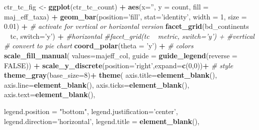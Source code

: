 \documentclass[
]{article}
\newenvironment{Shaded}{\begin{snugshade}}{\end{snugshade}}
\newcommand{\CommentTok}[1]{\textcolor[rgb]{0.56,0.35,0.01}{\textit{#1}}}
\newcommand{\DataTypeTok}[1]{\textcolor[rgb]{0.13,0.29,0.53}{#1}}
\newcommand{\DecValTok}[1]{\textcolor[rgb]{0.00,0.00,0.81}{#1}}
\newcommand{\FloatTok}[1]{\textcolor[rgb]{0.00,0.00,0.81}{#1}}
\newcommand{\KeywordTok}[1]{\textcolor[rgb]{0.13,0.29,0.53}{\textbf{#1}}}
\newcommand{\NormalTok}[1]{#1}
\newcommand{\OperatorTok}[1]{\textcolor[rgb]{0.81,0.36,0.00}{\textbf{#1}}}
\newcommand{\OtherTok}[1]{\textcolor[rgb]{0.56,0.35,0.01}{#1}}
\newcommand{\StringTok}[1]{\textcolor[rgb]{0.31,0.60,0.02}{#1}}
\begin{document}
\begin{Shaded}
\begin{Highlighting}[]
{{{{\NormalTok{ctr_tc_fig <-}\StringTok{ }\KeywordTok{ggplot}\NormalTok{(ctr_tc_count) }\OperatorTok{+}
\StringTok{                    }\KeywordTok{aes}\NormalTok{(}\DataTypeTok{x=}\StringTok{''}\NormalTok{, }\DataTypeTok{y =}\NormalTok{ count, }\DataTypeTok{fill =}\NormalTok{ maj_eff_taxa) }\OperatorTok{+}
\StringTok{                    }\KeywordTok{geom_bar}\NormalTok{(}\DataTypeTok{position=}\StringTok{'fill'}\NormalTok{,}
                             \DataTypeTok{stat=}\StringTok{'identity'}\NormalTok{,}
                             \DataTypeTok{width =} \DecValTok{1}\NormalTok{,}
                             \DataTypeTok{size =} \FloatTok{0.01}\NormalTok{) }\OperatorTok{+}
\StringTok{                    }\CommentTok{# activate for vertical or horizontal version}
\StringTok{                      }\KeywordTok{facet_grid}\NormalTok{(bd_continents }\OperatorTok{~}\StringTok{ }\NormalTok{tc, }\DataTypeTok{switch=}\StringTok{'y'}\NormalTok{) }\OperatorTok{+}\StringTok{ }\CommentTok{#horizontal}
\StringTok{                      }\CommentTok{#facet_grid(tc ~ metric, switch='y') +  #vertical}
\StringTok{                    }\CommentTok{# convert to pie chart}
\StringTok{                      }\KeywordTok{coord_polar}\NormalTok{(}\DataTypeTok{theta =} \StringTok{'y'}\NormalTok{) }\OperatorTok{+}
\StringTok{                    }\CommentTok{# colors}
\StringTok{                      }\KeywordTok{scale_fill_manual}\NormalTok{(}
                        \DataTypeTok{values=}\NormalTok{majeff_col,}
                        \DataTypeTok{guide =} \KeywordTok{guide_legend}\NormalTok{(}\DataTypeTok{reverse =} \OtherTok{FALSE}\NormalTok{))  }\OperatorTok{+}
\StringTok{                        }\KeywordTok{scale_y_discrete}\NormalTok{(}\DataTypeTok{position=}\StringTok{'right'}\NormalTok{,}\DataTypeTok{expand=}\KeywordTok{c}\NormalTok{(}\DecValTok{0}\NormalTok{,}\DecValTok{0}\NormalTok{))}\OperatorTok{+}
\StringTok{                    }\CommentTok{# style}
\StringTok{                      }\KeywordTok{theme_gray}\NormalTok{(}\DataTypeTok{base_size=}\DecValTok{8}\NormalTok{)}\OperatorTok{+}
\StringTok{                      }\KeywordTok{theme}\NormalTok{(}
                        \DataTypeTok{axis.title=}\KeywordTok{element_blank}\NormalTok{(),}
                        \DataTypeTok{axis.line=}\KeywordTok{element_blank}\NormalTok{(),}
                        \DataTypeTok{axis.ticks=}\KeywordTok{element_blank}\NormalTok{(),}
                        \DataTypeTok{axis.text=}\KeywordTok{element_blank}\NormalTok{(),}
                        
                        \DataTypeTok{legend.position =} \StringTok{"bottom"}\NormalTok{,}
                        \DataTypeTok{legend.justification=}\StringTok{'center'}\NormalTok{,}
                        \DataTypeTok{legend.direction=}\StringTok{'horizontal'}\NormalTok{,}
                        \DataTypeTok{legend.title =} \KeywordTok{element_blank}\NormalTok{(),}
                        
}}}}
\end{Highlighting}
\end{Shaded}
\end{document}
